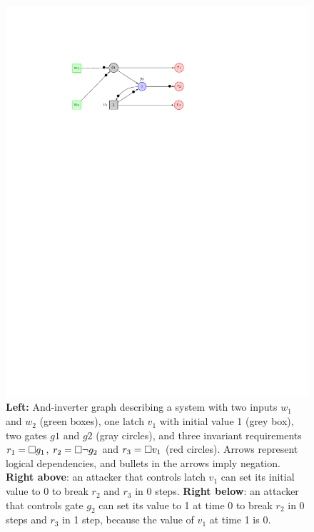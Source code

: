 {\begin{figure}[!t]
\begin{minipage}{0.35\textwidth}
\begin{framed}
\includegraphics[width=\textwidth]{Attack1.pdf}
\end{framed}
\end{minipage}
\caption{\textbf{Left:} And-inverter graph describing a system with two
inputs $w_1$ and $w_2$ (green boxes), one latch $v_1$ with initial value 1 (grey box), two gates $g1$ and $g2$ (gray circles), and three invariant requirements $r_1={{\square}} g_1$, $r_2={{\square}} \lnot g_2$ and $r_3={{\square}} v_1$ (red circles). Arrows represent logical dependencies, and bullets in the arrows imply negation. \newline
\textbf{Right above}: an attacker that controls latch $v_1$ can set its initial value to 0 to break $r_2$ and $r_3$ in 0 steps.\newline
\textbf{Right below}: an attacker that controls gate $g_2$ can set its value to 1 at time 0 to break $r_2$ in 0 steps and $r_3$ in 1 step, because the value of $v_1$ at time 1 is 0. }%
\label{fig:Example}
\end{figure}
%


}
